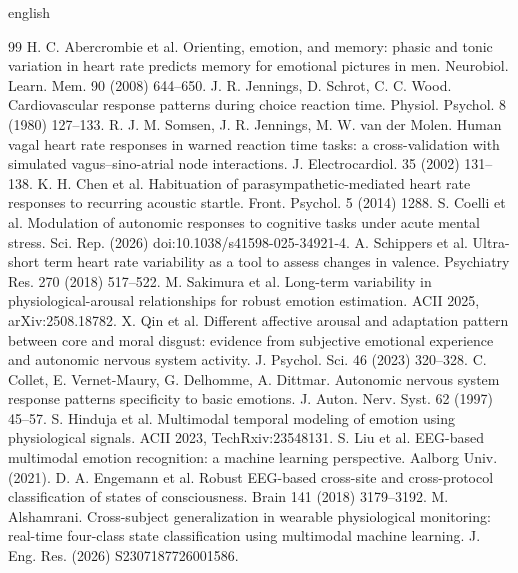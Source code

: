 \documentclass[10pt]{article}
\begin{document}
\begin{otherlanguage*}{english}
\begin{thebibliography}{99}\footnotesize\setlength{\itemsep}{1.0pt}
 H. C. Abercrombie et al. Orienting, emotion, and memory: phasic and tonic variation in heart rate predicts memory for emotional pictures in men. Neurobiol. Learn. Mem. 90 (2008) 644--650.
 J. R. Jennings, D. Schrot, C. C. Wood. Cardiovascular response patterns during choice reaction time. Physiol. Psychol. 8 (1980) 127--133.
 R. J. M. Somsen, J. R. Jennings, M. W. van der Molen. Human vagal heart rate responses in warned reaction time tasks: a cross-validation with simulated vagus--sino-atrial node interactions. J. Electrocardiol. 35 (2002) 131--138.
 K. H. Chen et al. Habituation of parasympathetic-mediated heart rate responses to recurring acoustic startle. Front. Psychol. 5 (2014) 1288.
 S. Coelli et al. Modulation of autonomic responses to cognitive tasks under acute mental stress. Sci. Rep. (2026) doi:10.1038/s41598-025-34921-4.
 A. Schippers et al. Ultra-short term heart rate variability as a tool to assess changes in valence. Psychiatry Res. 270 (2018) 517--522.
 M. Sakimura et al. Long-term variability in physiological-arousal relationships for robust emotion estimation. ACII 2025, arXiv:2508.18782.
 X. Qin et al. Different affective arousal and adaptation pattern between core and moral disgust: evidence from subjective emotional experience and autonomic nervous system activity. J. Psychol. Sci. 46 (2023) 320--328.
 C. Collet, E. Vernet-Maury, G. Delhomme, A. Dittmar. Autonomic nervous system response patterns specificity to basic emotions. J. Auton. Nerv. Syst. 62 (1997) 45--57.
 S. Hinduja et al. Multimodal temporal modeling of emotion using physiological signals. ACII 2023, TechRxiv:23548131.
 S. Liu et al. EEG-based multimodal emotion recognition: a machine learning perspective. Aalborg Univ. (2021).
 D. A. Engemann et al. Robust EEG-based cross-site and cross-protocol classification of states of consciousness. Brain 141 (2018) 3179--3192.
 M. Alshamrani. Cross-subject generalization in wearable physiological monitoring: real-time four-class state classification using multimodal machine learning. J. Eng. Res. (2026) S2307187726001586.

\end{thebibliography}
\end{otherlanguage*}
\end{document}
